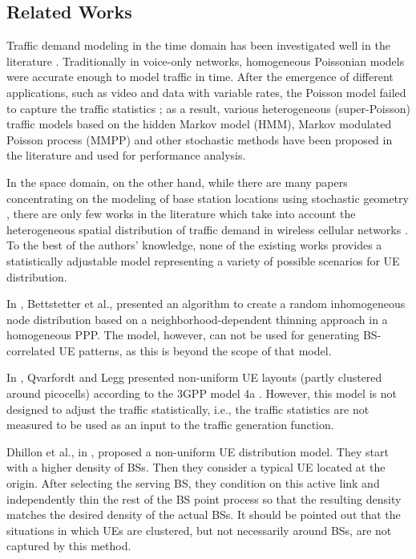 \documentclass[journal]{IEEEtran}
\begin{document}
\subsection{Related Works}

Traffic demand modeling in the time domain has been investigated well in the literature \cite{paxson1995wide, fischer1993markov, heffes1986markov, klemm2003modeling, muscariello2005markov, dainotti2008internet, maheshwari2011joint, xie2012modeling}. Traditionally in voice-only networks, homogeneous Poissonian models were accurate enough to model traffic in time. After the emergence of different applications, such as video and data with variable rates, the Poisson model failed to capture the traffic statistics \cite{paxson1995wide}; as a result, various heterogeneous (super-Poisson) traffic models based on the hidden Markov model (HMM), Markov modulated Poisson process (MMPP) \cite{fischer1993markov} and other stochastic methods have been proposed in the literature and used for performance analysis. 

In the space domain, on the other hand, while there are many papers concentrating on the modeling of base station locations using stochastic geometry \cite{elsawy2013stochastic,andrews2010primer}, there are only few works in the literature which take into account the heterogeneous spatial distribution of traffic demand in wireless cellular networks \cite{bettstetter2007inhomogeneous, qvarfordt2012evaluation, 3GPP, dhillon2012modeling1, taranetz2012performance,dongheon2014,wangload}. To the best of the authors' knowledge, none of the existing works provides a statistically adjustable model representing a variety of possible scenarios for UE distribution.

In \cite{bettstetter2007inhomogeneous}, Bettstetter et al., presented an algorithm to create a random inhomogeneous node distribution based on a neighborhood-dependent thinning approach in a homogeneous PPP. The model, however, can not be used for generating BS-correlated UE patterns, as this is beyond the scope of that model.

In \cite{qvarfordt2012evaluation}, Qvarfordt and Legg presented non-uniform UE layouts (partly clustered around picocells) according to the 3GPP model 4a \cite{3GPP}. However, this model is not designed to adjust the traffic statistically, i.e., the traffic statistics are not measured to be used as an input to the traffic generation function.

Dhillon et al., in \cite{dhillon2012modeling1}, proposed a non-uniform UE distribution model. They start with a higher density of BSs. Then they consider a typical UE located at the origin. After selecting the serving BS, they condition on this active link and independently thin the rest of the BS point process so that the resulting density matches the desired density of the actual BSs. It should be pointed out that the situations in which UEs are clustered, but not necessarily around BSs, are not captured by this method.
\end{document}
